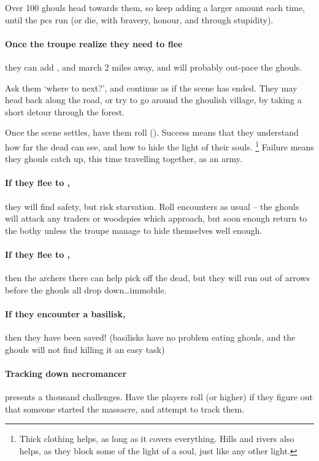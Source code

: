 Over 100 ghouls head towards them, so keep adding a larger amount each time, until the \glspl{pc} run (or die, with bravery, honour, and through stupidity).

\paragraph{Once the troupe realize they need to flee}
they can add , and march 2 miles away, and will probably out-pace the ghouls.

Ask them `where to next?', and continue as if the scene has ended.
They may head back along the road, or try to go around the ghoulish \gls{village}, by taking a short detour through the forest.

Once the scene settles, have them roll  (\tn[12]).
Success means that they understand how far the dead can see, and how to hide the light of their souls.%
\footnote{Thick clothing helps, as long as it covers everything. Hills and rivers also helps, as they block some of the light of a soul, just like any other light.}
Failure means they ghouls catch up, this time travelling together, as an army.

\paragraph{If they flee to ,}
they will find safety, but risk starvation.
Roll encounters as usual -- the ghouls will attack any traders or woodspies which approach, but soon enough return to the \gls{bothy} unless the troupe manage to hide themselves well enough.

\paragraph{If they flee to ,}
then the archers there can help pick off the dead, but they will run out of arrows before the ghouls all drop down\ldots immobile.

\paragraph{If they encounter a basilisk,}
then they have been saved!
(basilisks have no problem eating ghouls, and the ghouls will not find killing it an easy task)

\paragraph{Tracking down \gls{necromancer}}
presents a thousand challenges.
Have the players roll  (\tn[14] or higher) if they figure out that someone started the massacre, and attempt to track them.

